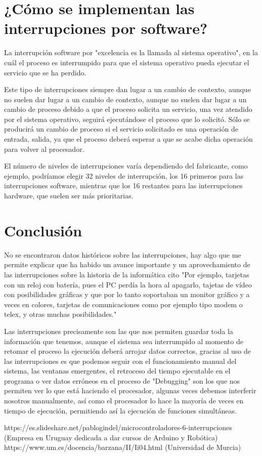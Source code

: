 \documentclass[11pt]{article}
\begin{document}
\section{¿Cómo se implementan las interrupciones por software?}
La interrupción software por "excelencia es la llamada al sistema operativo", en la cuál el proceso es interrumpido para que el sistema operativo pueda ejecutar el servicio que se ha perdido.

Este tipo de interrupciones siempre dan lugar a un cambio de contexto, aunque no suelen dar lugar a un cambio de contexto, aunque no suelen dar lugar a un cambio de proceso debido a que el proceso solicita un servicio, una vez atendido por el sistema operativo, seguirá ejecutándose el proceso que lo solicitó. Sólo se producirá un cambio de proceso si el servicio solicitado es una operación de entrada, salida, ya que el proceso deberá esperar a que se acabe dicha operación para volver al procesador.


El número de niveles de interrupciones varía dependiendo del fabricante, como ejemplo, podríamos elegir 32 niveles de interrupción, los 16 primeros para las interrupciones software, mientras que los 16 restantes para las interrupciones hardware, que suelen ser más prioritarias.



\section{Conclusión}

No se encontraron datos históricos sobre las interrupciones, hay algo que me permite explicar que ha habido un avance importante y un aprovechamiento de las interrupciones sobre la historia de la informática cito "Por ejemplo, tarjetas con un reloj con batería, pues el PC perdía la hora al apagarlo, tajetas de vídeo con posibilidades gráficas y que por lo tanto soportaban un monitor gráfico y a veces en colores, tarjetas de comunicaciones como por ejemplo tipo modem o telex, y otras muchas posibilidades."

Las interrupciones precisamente son las que nos permiten guardar toda la información que tenemos, aunque el sistema sea interrumpido al momento de retomar el proceso la ejecución deberá arrojar datos correctos, gracias al uso de las interrupciones es que podemos seguir con el funcionamiento manual del sistema, las ventanas emergentes, el retroceso del tiempo ejecutable en el programa o ver datos erróneos en el proceso de "Debugging" son los que nos permiten ver lo que está haciendo el procesador, algunas veces debemos interferir nosotros manualmente, así como el procesador lo hace la mayoría de veces en tiempo de ejecución, permitiendo así la ejecución de funciones simultáneas.

\medskip

 
 https://es.slideshare.net/pablogindel/microcontroladores-6-interrupciones (Empresa en Uruguay dedicada a dar cursos de Arduino y Robótica)
https://www.um.es/docencia/barzana/II/Ii04.html (Universidad de Murcia)
\end{document}
